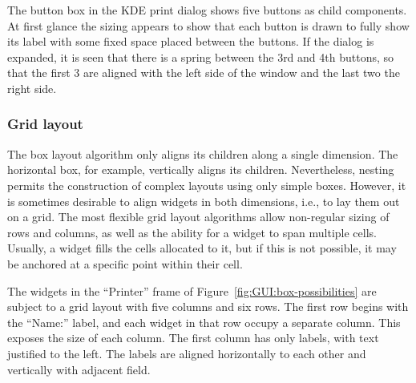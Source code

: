 The button box in the KDE print dialog shows five buttons as child
components. At first glance the sizing appears to show that each
button is drawn to fully show its label with some fixed space placed
between the buttons. If the dialog is expanded, it is seen that there
is a spring between the 3rd and 4th buttons, so that the first 3 are
aligned with the left side of the window and the last two the right
side.

\subsubsection{Grid layout}
\label{sec:GUI:grid-layout}

The box layout algorithm only aligns its children along a single
dimension. The horizontal box, for example, vertically aligns its
children. Nevertheless, nesting permits the construction of complex
layouts using only simple boxes. However, it is sometimes desirable to
align widgets in both dimensions, i.e., to lay them out on a grid. The
most flexible grid layout algorithms allow non-regular sizing of rows
and columns, as well as the ability for a widget to span multiple
cells. Usually, a widget fills the cells allocated to it, but if this
is not possible, it may be anchored at a specific point within their
cell. 

The widgets in the ``Printer'' frame of
Figure~\ref{fig:GUI:box-possibilities} are subject to a grid layout
with five columns and six rows. The first row begins with the
``Name:'' label, and each widget in that row occupy a separate
column. This exposes the size of each column. The first column has
only labels, with text justified to the left.  The labels are aligned
horizontally to each other and vertically with adjacent field.













